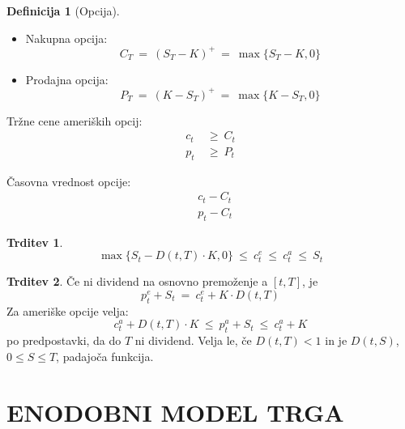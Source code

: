 \documentclass[11pt]{article}
\theoremstyle{definition}
\newtheorem{definicija}{Definicija}[section]
\theoremstyle{definition}
\newtheorem{trditev}{Trditev}[section]
\begin{document}
\begin{definicija}[Opcija]

\begin{itemize}
	
	\item Nakupna opcija:
	$$C_T ~=~ (S_T - K)^+ ~=~ \max{\{ S_T - K, 0 \}}$$
	
	\item Prodajna opcija:
	$$P_T ~=~ (K - S_T)^+ ~=~ \max{\{ K - S_T, 0 \}}$$
	
\end{itemize}

Tržne cene ameriških opcij:
\begin{align*}
c_t ~&\geq~ C_t \\
p_t ~&\geq~ P_t
\end{align*}

Časovna vrednost opcije:
\begin{align*}
&c_t - C_t \\
&p_t - C_t
\end{align*}

\end{definicija}
\vspace{0.5cm}

\begin{trditev}

$$\max{\{ S_t - D(t, T) \cdot K, 0\}} ~\leq~ c_t^e ~\leq~ c_t^a ~\leq~ S_t$$

\end{trditev}
\vspace{0.5cm}

\begin{trditev}

Če ni dividend na osnovno premoženje  a $[t, T]$, je
$$p_t^e + S_t ~=~ c_t^e + K \cdot D(t, T)$$
Za ameriške opcije velja:
$$c_t^a + D(t, T) \cdot K ~\leq~ p_t^a + S_t ~\leq~ c_t^a + K$$
po predpostavki, da do $T$ ni dividend. Velja le, če $D(t, T)<1$ in je $D(t, S)$, $0 \leq S \leq T$, padajoča funkcija. 

\end{trditev}
\vspace{0.5cm}

\pagebreak


\section{ENODOBNI MODEL TRGA}
\vspace{0.5cm}
\end{document}
